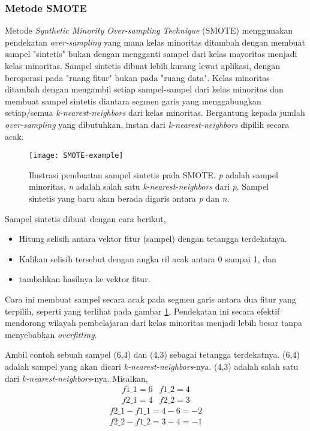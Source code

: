 \subsubsection{Metode SMOTE}

Metode \textit{Synthetic Minority Over-sampling Technique} (SMOTE) \cite{chawla2002smote} menggunakan pendekatan \textit{over-sampling} yang mana kelas minoritas ditambah dengan membuat sampel "sintetis" bukan dengan mengganti sampel dari kelas mayoritas menjadi kelas minoritas.
Sampel sintetis dibuat lebih kurang lewat aplikasi, dengan beroperasi pada "ruang fitur" bukan pada "ruang data".
Kelas minoritas ditambah dengan mengambil setiap sampel-sampel dari kelas minoritas dan membuat sampel sintetis diantara segmen garis yang menggabungkan setiap/semua \textit{k-nearest-neighbors} dari kelas minoritas.
Bergantung kepada jumlah \textit{over-sampling} yang dibutuhkan, instan dari \textit{k-nearest-neighbors} dipilih secara acak.

\begin{figure}[t]
	\centering
	\texttt{[image: SMOTE-example]}
	\caption{Ilustrasi pembuatan sampel sintetis pada SMOTE.
		\textit{p} adalah sampel minoritas, \textit{n} adalah salah satu \textit{k-nearest-neighbors} dari \textit{p}.
		Sampel sintetis yang baru akan berada digaris antara \textit{p} dan \textit{n}.
	}
	\label{fig:smote}
\end{figure}

Sampel sintetis dibuat dengan cara berikut,
\begin{itemize}
	\item Hitung selisih antara vektor fitur (sampel) dengan tetangga terdekatnya.
	\item Kalikan selisih tersebut dengan angka ril acak antara 0 sampai 1, dan
	\item tambahkan hasilnya ke vektor fitur.
\end{itemize}

Cara ini membuat sampel secara acak pada segmen garis antara dua fitur yang terpilih, seperti yang terlihat pada gambar \ref{fig:smote}.
Pendekatan ini secara efektif mendorong wilayah pembelajaran dari kelas minoritas menjadi lebih besar tanpa menyebabkan \textit{overfitting}.

Ambil contoh sebuah sampel (6,4) dan (4,3) sebagai tetangga terdekatnya.
(6,4) adalah sampel yang akan dicari \textit{k-nearest-neighbors}-nya.
(4,3) adalah salah satu dari \textit{k-nearest-neighbors}-nya.
Misalkan,
\[
\begin{matrix}
f1\_1 = 6 & f1\_2 = 4 \\
f2\_1 = 4 & f2\_2 = 3
\end{matrix}
\]
\[
\begin{matrix}
f2\_1 - f1\_1 = 4 - 6 = -2 \\
f2\_2 - f1\_2 = 3 - 4 = -1
\end{matrix}
\]

